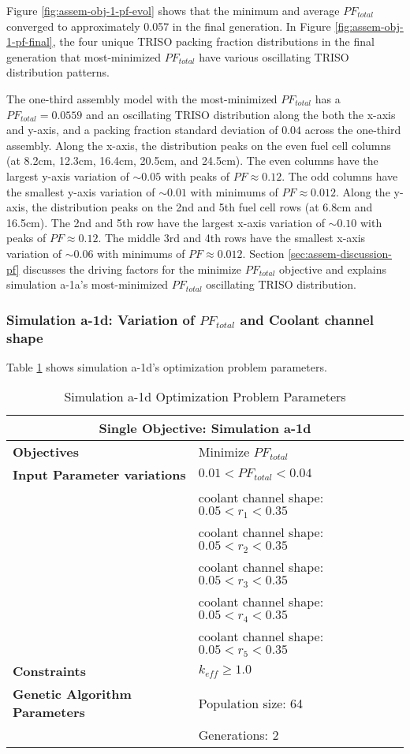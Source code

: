 Figure \ref{fig:assem-obj-1-pf-evol} shows that the minimum and average $PF_{total}$ 
converged to approximately 0.057 in the final generation. 
In Figure \ref{fig:assem-obj-1-pf-final}, the four unique TRISO packing fraction 
distributions in the final generation that most-minimized $PF_{total}$ have various 
oscillating TRISO distribution patterns. 

The one-third assembly model with the most-minimized $PF_{total}$ has a 
$PF_{total} =0.0559$ and an oscillating TRISO distribution along the both the 
x-axis and y-axis, and a packing fraction standard deviation of $0.04$ across the 
one-third assembly. 
Along the x-axis, the distribution peaks on the even fuel cell columns (at 8.2cm, 12.3cm, 
16.4cm, 20.5cm, and 24.5cm). 
The even columns have the largest y-axis variation of $\sim0.05$ with peaks of
$PF\approx0.12$.
The odd columns have the smallest y-axis variation of $\sim0.01$ with minimums of 
$PF\approx0.012$.
Along the y-axis, the distribution peaks on the 2nd and 5th fuel cell rows (at 6.8cm and 
16.5cm).
The 2nd and 5th row have the largest x-axis variation of $\sim0.10$ with peaks of 
$PF\approx0.12$. 
The middle 3rd and 4th rows have the smallest x-axis variation of $\sim0.06$ with 
minimums of $PF\approx0.012$.
Section \ref{sec:assem-discussion-pf} discusses the driving factors for the minimize 
$PF_{total}$ objective and explains simulation a-1a's most-minimized $PF_{total}$ 
oscillating TRISO distribution. 

\subsubsection{Simulation a-1d: Variation of $PF_{total}$ and Coolant channel shape}
Table \ref{tab:simulationa1d} shows simulation a-1d's optimization problem parameters. 
\begin{table}[htbp!]
    \centering
    \onehalfspacing
    \caption{Simulation a-1d Optimization Problem Parameters}
	\label{tab:simulationa1d}
    \footnotesize
    \begin{tabular}{l|p{6cm}}
    \hline 
    \multicolumn{2}{c}{\textbf{Single Objective: Simulation a-1d}} \\
    \hline 
    \textbf{Objectives} & Minimize $PF_{total}$ \\
    \hline 
    \textbf{Input Parameter variations} & $0.01<PF_{total}<0.04$ \\
    & coolant channel shape: $0.05<r_{1}<0.35$ \\
    & coolant channel shape: $0.05<r_{2}<0.35$ \\
    & coolant channel shape: $0.05<r_{3}<0.35$ \\
    & coolant channel shape: $0.05<r_{4}<0.35$ \\
    & coolant channel shape: $0.05<r_{5}<0.35$ \\
    \hline
    \textbf{Constraints} & $k_{eff} \geq 1.0$\\ 
    \hline 
    \textbf{Genetic Algorithm Parameters} & Population size: 64 \\
    & Generations: 2 \\
    \hline
    \end{tabular}
\end{table}

